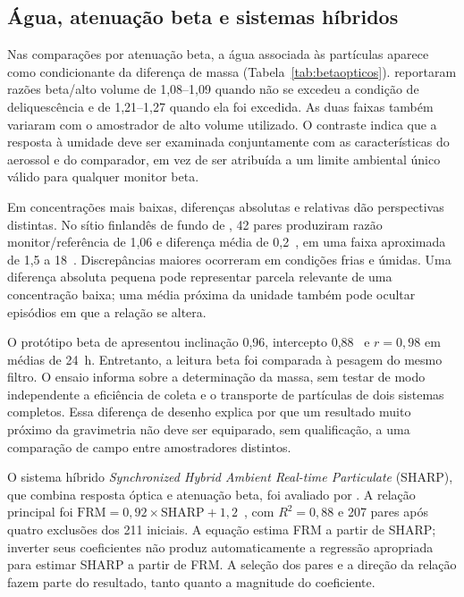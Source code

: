\subsection{Água, atenuação beta e sistemas híbridos}

Nas comparações por atenuação beta, a água associada às partículas aparece como condicionante da diferença de massa (Tabela~\ref{tab:betaopticos}). \textcite{rsl170} reportaram razões beta/alto volume de 1,08--1,09 quando não se excedeu a condição de deliquescência e de 1,21--1,27 quando ela foi excedida. As duas faixas também variaram com o amostrador de alto volume utilizado. O contraste indica que a resposta à umidade deve ser examinada conjuntamente com as características do aerossol e do comparador, em vez de ser atribuída a um limite ambiental único válido para qualquer monitor beta.



Em concentrações mais baixas, diferenças absolutas e relativas dão perspectivas distintas. No sítio finlandês de fundo de \textcite{rsl073}, 42 pares produziram razão monitor/referência de 1,06 e diferença média de 0,2~\ugm{}, em uma faixa aproximada de 1,5 a 18~\ugm{}. Discrepâncias maiores ocorreram em condições frias e úmidas. Uma diferença absoluta pequena pode representar parcela relevante de uma concentração baixa; uma média próxima da unidade também pode ocultar episódios em que a relação se altera.

O protótipo beta de \textcite{rsl214} apresentou inclinação 0,96, intercepto 0,88~\ugm{} e $r=0{,}98$ em médias de 24~h. Entretanto, a leitura beta foi comparada à pesagem do mesmo filtro. O ensaio informa sobre a determinação da massa, sem testar de modo independente a eficiência de coleta e o transporte de partículas de dois sistemas completos. Essa diferença de desenho explica por que um resultado muito próximo da gravimetria não deve ser equiparado, sem qualificação, a uma comparação de campo entre amostradores distintos.

O sistema híbrido \textit{Synchronized Hybrid Ambient Real-time Particulate} (SHARP), que combina resposta óptica e atenuação beta, foi avaliado por \textcite{rsl059}. A relação principal foi $\mathrm{FRM}=0{,}92\times\mathrm{SHARP}+1{,}2$~\ugm{}, com $R^2=0{,}88$ e 207 pares após quatro exclusões dos 211 iniciais. A equação estima FRM a partir de SHARP; inverter seus coeficientes não produz automaticamente a regressão apropriada para estimar SHARP a partir de FRM. A seleção dos pares e a direção da relação fazem parte do resultado, tanto quanto a magnitude do coeficiente.

